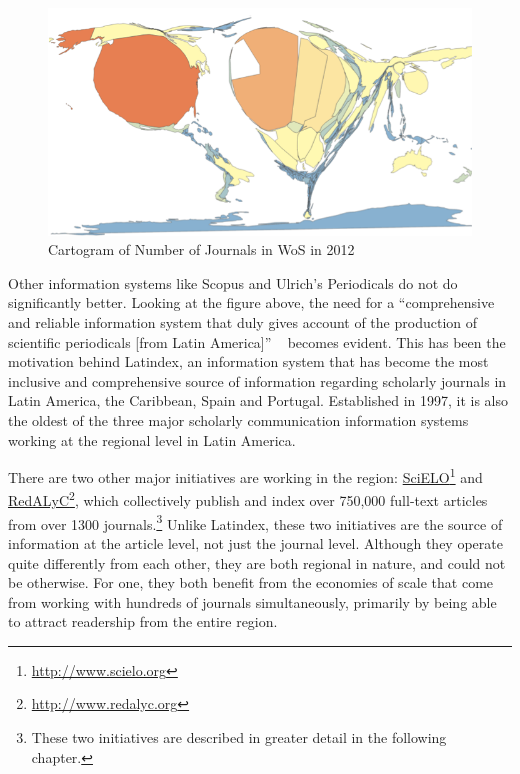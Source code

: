 \begin{figure}[htbp]
\centering
\includegraphics[keepaspectratio,width=\textwidth,height=0.75\textheight]{figures/wos_2012_cartogram.png}
\caption{Cartogram of Number of Journals in WoS in 2012}
\label{wos_cartogram}
\end{figure}

Other information systems like Scopus and Ulrich's Periodicals do not do significantly better. Looking at the figure above, the need for a ``comprehensive and reliable information system that duly gives account of the production of scientific periodicals [from Latin America]'' ~\citep[p. 91]{Cetto1998} becomes evident. This has been the motivation behind Latindex, an information system that has become the most inclusive and comprehensive source of information regarding scholarly journals in Latin America, the Caribbean, Spain and Portugal. Established in 1997, it is also the oldest of the three major scholarly communication information systems working at the regional level in Latin America.

There are two other major initiatives are working in the region: \href{http://www.scielo.org}{SciELO}\footnote{\href{http://www.scielo.org}{http:/\slash www.scielo.org}} and \href{http://www.redalyc.org}{RedALyC}\footnote{\href{http://www.redalyc.org}{http:/\slash www.redalyc.org}}, which collectively publish and index over 750,000 full-text articles from over 1300 journals.\footnote{These two initiatives are described in greater detail in the following chapter.} Unlike Latindex, these two initiatives are the source of information at the article level, not just the journal level. Although they operate quite differently from each other, they are both regional in nature, and could not be otherwise. For one, they both benefit from the economies of scale that come from working with hundreds of journals simultaneously, primarily by being able to attract readership from the entire region.

